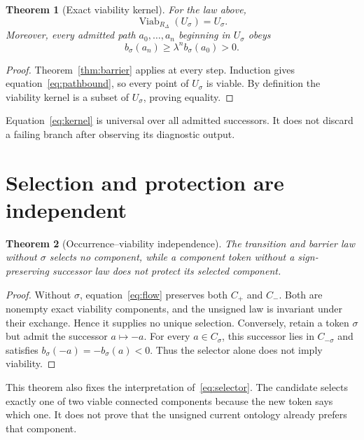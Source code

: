 \documentclass[11pt]{article}
\newtheorem{theorem}{Theorem}
\newcommand{\Us}{U_{\sigma}}
\newcommand{\bs}{b_{\sigma}}
\newcommand{\Viab}{\operatorname{Viab}}
\begin{document}
\begin{theorem}[Exact viability kernel]
\label{thm:viability}
For the law above,
\begin{equation}
 \Viab_{R_\Delta}(\Us)=\Us.
 \label{eq:kernel}
\end{equation}
Moreover, every admitted path $a_0,\ldots,a_n$ beginning in $\Us$ obeys
\begin{equation}
 \bs(a_n)\geq\lambda^n\bs(a_0)>0.
 \label{eq:pathbound}
\end{equation}
\end{theorem}

\begin{proof}
Theorem~\ref{thm:barrier} applies at every step.  Induction gives
equation~\eqref{eq:pathbound}, so every point of $\Us$ is viable.  By
definition the viability kernel is a subset of $\Us$, proving equality.
\end{proof}

Equation~\eqref{eq:kernel} is universal over all admitted successors.  It
does not discard a failing branch after observing its diagnostic output.

\section{Selection and protection are independent}

\begin{theorem}[Occurrence--viability independence]
\label{thm:independence}
The transition and barrier law without $\sigma$ selects no component, while a
component token without a sign-preserving successor law does not protect its
selected component.
\end{theorem}

\begin{proof}
Without $\sigma$, equation~\eqref{eq:flow} preserves both $C_+$ and $C_-$.
Both are nonempty exact viability components, and the unsigned law is
invariant under their exchange.  Hence it supplies no unique selection.
Conversely, retain a token $\sigma$ but admit the successor $a\mapsto-a$.
For every $a\in C_\sigma$, this successor lies in $C_{-\sigma}$ and satisfies
$\bs(-a)=-\bs(a)<0$.  Thus the selector alone does not imply viability.
\end{proof}

This theorem also fixes the interpretation of~\eqref{eq:selector}.  The
candidate selects exactly one of two viable connected components because the
new token says which one.  It does not prove that the unsigned current
ontology already prefers that component.
\end{document}
